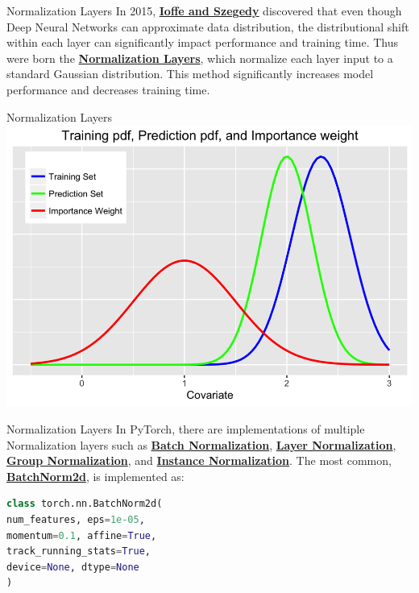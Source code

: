 \documentclass{beamer}
\begin{document}
\begin{frame}[fragile]{Normalization Layers}
    In 2015, \href{https://arxiv.org/abs/1502.03167}{\textbf{Ioffe and Szegedy}} discovered that even though Deep Neural Networks can approximate data distribution, the distributional shift within each layer can significantly impact performance and training time. Thus were born the \href{https://pytorch.org/docs/stable/nn.html#normalization-layers}{\textbf{Normalization Layers}}, which normalize each layer input to a standard Gaussian distribution. This method significantly increases model performance and decreases training time.
\end{frame}
\begin{frame}[fragile]{Normalization Layers}
    \centering\includegraphics[width=\textwidth,height=\textheight,keepaspectratio]{figures/Covariance.png}
\end{frame}
\begin{frame}[fragile]{Normalization Layers}
    In PyTorch, there are implementations of multiple Normalization layers such as \href{https://arxiv.org/abs/1502.03167}{\textbf{Batch Normalization}}, \href{https://arxiv.org/abs/1607.06450}{\textbf{Layer Normalization}}, \href{https://arxiv.org/abs/1803.08494}{\textbf{Group Normalization}}, and \href{https://arxiv.org/abs/1701.02096}{\textbf{Instance Normalization}}. The most common, \href{https://pytorch.org/docs/stable/generated/torch.nn.BatchNorm2d.html}{\textbf{BatchNorm2d}}, is implemented as:
    \begin{exampleblock}{}
        \begin{lstlisting}[language=Python]
class torch.nn.BatchNorm2d(
num_features, eps=1e-05,
momentum=0.1, affine=True,
track_running_stats=True,
device=None, dtype=None
)
        \end{lstlisting}
    \end{exampleblock}
\end{frame}
\end{document}

